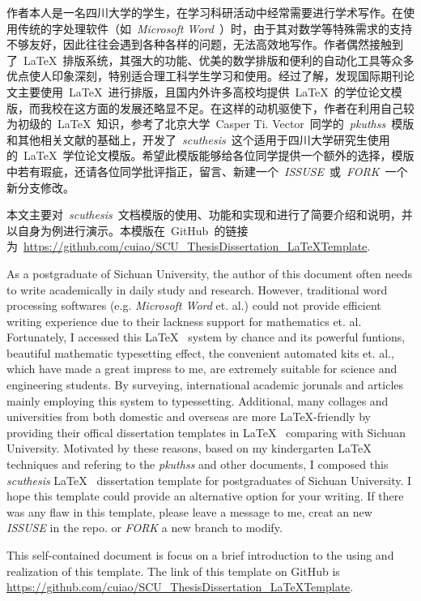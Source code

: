 \begin{CHSabstract}
	作者本人是一名四川大学的学生，在学习科研活动中经常需要进行学术写作。在使用传统的字处理软件（如~\emph{Microsoft\textsuperscript{\textregistered} Word}~）时，由于其对数学等特殊需求的支持不够友好，因此往往会遇到各种各样的问题，无法高效地写作。作者偶然接触到了~\LaTeX~排版系统，其强大的功能、优美的数学排版和便利的自动化工具等众多优点使人印象深刻，特别适合理工科学生学习和使用。经过了解，发现国际期刊论文主要使用~\LaTeX~进行排版，且国内外许多高校均提供~\LaTeX~的学位论文模版，而我校在这方面的发展还略显不足。在这样的动机驱使下，作者在利用自己较为初级的~\LaTeX~知识，参考了北京大学~Casper Ti. Vector~同学的~\emph{pkuthss}~模版和其他相关文献的基础上，开发了~\emph{scuthesis}~这个适用于四川大学研究生使用的~\LaTeX~学位论文模版。希望此模版能够给各位同学提供一个额外的选择，模版中若有瑕疵，还请各位同学批评指正，留言、新建一个~\emph{ISSUSE}~或~\emph{FORK}~一个新分支修改。


	本文主要对~\emph{scuthesis}~文档模版的使用、功能和实现和进行了简要介绍和说明，并以自身为例进行演示。本模版在~GitHub~的链接为~\url{https://github.com/cuiao/SCU_ThesisDissertation_LaTeXTemplate}.
\end{CHSabstract}

\begin{ENGabstract}
	As a postgraduate of Sichuan University, the author of this document often needs to write academically in daily study and research. However, traditional word processing softwares (e.g. \emph{Microsoft\textsuperscript{\textregistered} Word} et. al.) could not provide efficient writing experience due to their lackness support for mathematics et. al. Fortunately, I accessed this \LaTeX~ system by chance and its powerful funtions, beautiful mathematic typesetting effect, the convenient automated kits et. al., which have made a great impress to me, are extremely suitable for science and engineering students. By surveying, international academic jorunals and articles mainly employing this system to typessetting. Additional, many collages and universities from both domestic and overseas are more \LaTeX-friendly by providing their offical dissertation templates in \LaTeX~ comparing with Sichuan University. Motivated by these reasons, based on my kindergarten \LaTeX~ techniques and refering to the \emph{pkuthss} and other documents, I composed this \emph{scuthesis} \LaTeX~ dissertation template for postgraduates of Sichuan University. I hope this template could provide an alternative option for your writing. If there was any flaw in this template, please leave a message to me, creat an new \emph{ISSUSE} in the repo. or \emph{FORK} a new branch to modify.


	This self-contained document is focus on a brief introduction to the using and realization of this template. The link of this template on GitHub is \url{https://github.com/cuiao/SCU_ThesisDissertation_LaTeXTemplate}.
\end{ENGabstract}
